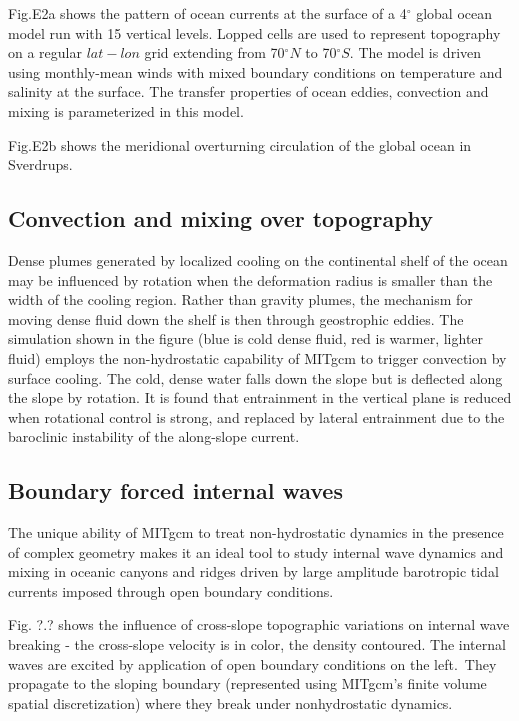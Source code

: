 \documentclass[12pt]{book}
\begin{document}
Fig.E2a shows the pattern of ocean currents at the surface of a 4$^{\circ }$
global ocean model run with 15 vertical levels. Lopped cells are used to
represent topography on a regular $lat-lon$ grid extending from 70$^{\circ
}N $ to 70$^{\circ }S$. The model is driven using monthly-mean winds with
mixed boundary conditions on temperature and salinity at the surface. The
transfer properties of ocean eddies, convection and mixing is parameterized
in this model.

Fig.E2b shows the meridional overturning circulation of the global ocean in
Sverdrups.


\subsection{Convection and mixing over topography}

Dense plumes generated by localized cooling on the continental shelf of the
ocean may be influenced by rotation when the deformation radius is smaller
than the width of the cooling region. Rather than gravity plumes, the
mechanism for moving dense fluid down the shelf is then through geostrophic
eddies. The simulation shown in the figure (blue is cold dense fluid, red is
warmer, lighter fluid) employs the non-hydrostatic capability of MITgcm to
trigger convection by surface cooling. The cold, dense water falls down the
slope but is deflected along the slope by rotation. It is found that
entrainment in the vertical plane is reduced when rotational control is
strong, and replaced by lateral entrainment due to the baroclinic
instability of the along-slope current.


\subsection{Boundary forced internal waves}

The unique ability of MITgcm to treat non-hydrostatic dynamics in the
presence of complex geometry makes it an ideal tool to study internal wave
dynamics and mixing in oceanic canyons and ridges driven by large amplitude
barotropic tidal currents imposed through open boundary conditions.

Fig. ?.? shows the influence of cross-slope topographic variations on
internal wave breaking - the cross-slope velocity is in color, the density
contoured. The internal waves are excited by application of open boundary
conditions on the left.\ They propagate to the sloping boundary (represented
using MITgcm's finite volume spatial discretization) where they break under
nonhydrostatic dynamics.
\end{document}
